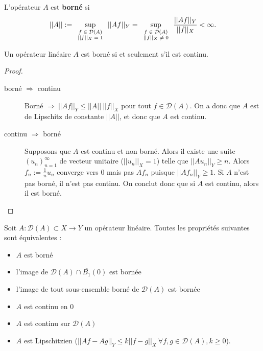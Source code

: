 \begin{definition}
    L'opérateur $A$ est \textbf{borné} si
    \begin{equation*}
        ||A|| := \sup_{\scriptsize{\begin{array}{c}f\in\mathcal{D}(A) \\ ||f||_X=1\end{array}}} ||Af||_Y = \sup_{\scriptsize{\begin{array}{c}f\in\mathcal{D}(A) \\ ||f||_X\neq0\end{array}}} \frac{||Af||_Y}{||f||_X} < \infty.
    \end{equation*}
\end{definition}

\begin{theo}
    Un opérateur linéaire $A$ est borné si et seulement s'il est continu.
\end{theo}
\begin{proof}
    \begin{description}
        \item[borné $\Rightarrow$ continu] Borné $\Rightarrow\ ||Af||_Y \leq ||A||\ ||f||_X$ pour tout $f\in\mathcal{D}(A)$. On a donc que $A$ est de Lipschitz de constante $||A||$, et donc que $A$ est continu.
        \item[continu $\Rightarrow$ borné] Supposons que $A$ est continu et non borné. Alors il existe une suite $(u_n)_{n=1}^\infty$ de vecteur unitaire ($||u_n||_X=1$) telle que $||Au_n||_Y\geq n$. Alors $f_n := \frac{1}{n}u_n$ converge vers 0 mais pas $Af_n$ puisque $||Af_n||_Y \geq 1$. Si $A$ n'est pas borné, il n'est pas continu. On conclut donc que si $A$ est continu, alors il est borné.
    \end{description}
\end{proof}

\begin{theo}
    Soit $A:\mathcal{D}(A) \subset X \rightarrow Y $ un opérateur linéaire. Toutes les propriétés suivantes sont équivalentes :
    \begin{itemize}
        \item $A$ est borné
        \item l'image de $\mathcal{D}(A) \cap \overline{B_1}(0)$ est bornée
        \item l'image de tout sous-ensemble borné de $\mathcal{D}(A)$ est bornée
        \item $A$ est continu en $0$
        \item $A$ est continu sur $\mathcal{D}(A)$
        \item $A$ est Lipschitzien ($||Af-Ag||_Y \leq k ||f-g||_X \ \forall f,g \in \mathcal{D}(A),k\geq0$).
    \end{itemize}
\end{theo}

